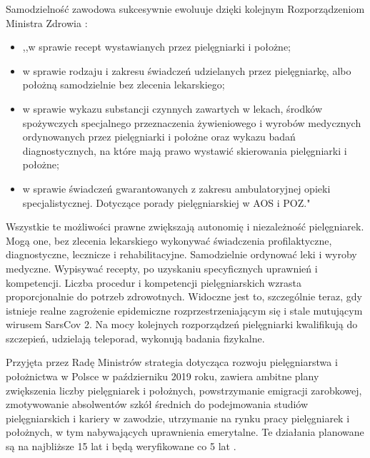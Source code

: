 \documentclass[a4paper,12pt,twoside,openright]{mwrep}
\begin{document}
Samodzielność zawodowa sukcesywnie ewoluuje dzięki kolejnym Rozporządzeniom Ministra Zdrowia \cite{akty}:
\begin{itemize}
	\item ,,w sprawie recept wystawianych przez pielęgniarki i położne;
	\item w sprawie rodzaju i zakresu świadczeń udzielanych przez pielęgniarkę, albo położną samodzielnie bez zlecenia lekarskiego;
	\item w sprawie wykazu substancji czynnych zawartych w lekach, środków spożywczych specjalnego przeznaczenia żywieniowego i wyrobów medycznych ordynowanych przez pielęgniarki i położne oraz wykazu badań diagnostycznych, na które mają prawo wystawić skierowania pielęgniarki i położne;
	\item w sprawie świadczeń gwarantowanych z zakresu ambulatoryjnej opieki specjalistycznej. Dotyczące porady pielęgniarskiej w AOS i POZ."
\end{itemize}

Wszystkie te możliwości prawne zwiększają autonomię i niezależność pielęgniarek. Mogą one, bez zlecenia lekarskiego wykonywać świadczenia profilaktyczne, diagnostyczne, lecznicze i rehabilitacyjne. Samodzielnie ordynować leki i wyroby medyczne. Wypisywać recepty, po uzyskaniu specyficznych uprawnień i kompetencji. Liczba procedur i kompetencji pielęgniarskich wzrasta proporcjonalnie do potrzeb zdrowotnych. Widoczne jest to, szczególnie teraz, gdy istnieje realne zagrożenie epidemiczne rozprzestrzeniającym się i stale mutującym wirusem SarsCov 2. Na mocy kolejnych rozporządzeń pielęgniarki kwalifikują do szczepień, udzielają teleporad, wykonują badania fizykalne.

Przyjęta przez Radę Ministrów strategia dotycząca rozwoju pielęgniarstwa i położnictwa w Polsce   w październiku 2019 roku, zawiera ambitne plany zwiększenia liczby pielęgniarek i położnych, powstrzymanie emigracji zarobkowej, zmotywowanie absolwentów szkół średnich do podejmowania studiów pielęgniarskich i kariery w zawodzie, utrzymanie na rynku pracy pielęgniarek i położnych, w tym nabywających uprawnienia emerytalne. Te działania planowane są na najbliższe 15 lat i będą weryfikowane co 5 lat \cite{strategia}.
\end{document}
